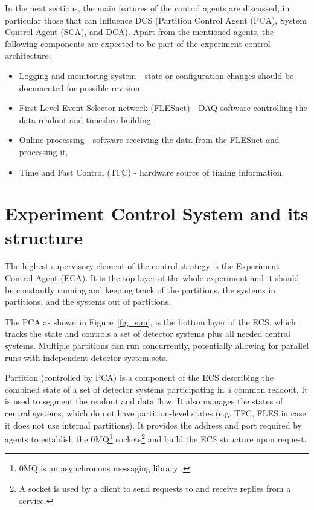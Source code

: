  In the next sections, the main features of the control agents are discussed, in particular those that can influence \gls{DCS} (Partition Control Agent (\gls{PCA}), System Control Agent (\gls{SCA}), and \gls{DCA}). Apart from the mentioned agents, the following components are expected to be part of the experiment control architecture: 
 \begin{itemize}
     \item Logging and monitoring system - state or configuration changes should be documented for possible revision.
     \item First Level Event Selector network (FLESnet) - \gls{DAQ} software controlling the data readout and timeslice building.
     \item Online processing - software receiving the data from the FLESnet and processing it,
     \item Time and Fast Control (\gls{TFC}) - hardware source of timing information.
 \end{itemize}
\section{Experiment Control System and its structure}\label{sssAgents}

The highest supervisory element of the control strategy is the Experiment Control Agent (\gls{ECA}). It is the top layer of the whole experiment and it should be constantly running and keeping track of the partitions, the systems in partitions, and the systems out of partitions. 

The \gls{PCA} as shown in Figure~\ref{fig_sim}, is the bottom layer of the \gls{ECS}, which tracks the state and controls a set of detector systems plus all needed central systems. Multiple partitions can run concurrently, potentially allowing for parallel runs with independent detector system sets. 

Partition (controlled by \gls{PCA}) is a component of the \gls{ECS} describing the combined state of a set of detector systems participating in a common readout. It is used to segment the readout and data flow. It also manages the states of central systems, which do not have partition-level states (e.g. \gls{TFC}, \gls{FLES} in case it does not use internal partitions).  It provides the address and port required by agents to establish the 0MQ\footnote{0MQ is an asynchronous messaging library \cite{zeromq}.} sockets\footnote{A socket is used by a client to send requests to and receive replies from a service.} and build the \gls{ECS} structure upon request.

